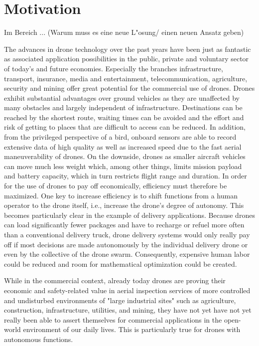\chapter{Motivation}

{\color{cyan}Im Bereich ... (Warum muss es eine neue L"osung/ einen neuen Ansatz geben)}




The advances in drone technology 
over the past years have been just as fantastic as 
associated application possibilities in the 
public, private and voluntary sector of today's and future economies.
Especially the branches 
infrastructure, transport, insurance, media and entertainment, 
telecommunication, agriculture, security and mining 
offer great potential for the commercial use of drones. \cite{PwC2016}
Drones exhibit substantial advantages over ground vehicles
as they are unaffected by many obstacles and largely independent of infrastructure.
Destinations can be reached by the shortest route, waiting times can be avoided
and the effort and risk of getting to places that are difficult to access can be reduced.
In addition, from the privileged perspective of a bird, onboard sensors 
are able to record extensive data 
of high quality as well as increased speed 
due to the fast aerial maneuverability of drones.
On the downside,
drones as smaller aircraft vehicles can move much less weight
which, among other things, limits mission payload and battery capacity,
which in turn restricts flight range and duration.
In order for the use of drones to pay off economically, efficiency must therefore be maximized.
One key to increase efficiency is to shift functions from a human operator to the drone itself,
i.e., increase the drone's degree of autonomy.
This becomes particularly clear in the example of delivery applications.
Because drones can load significantly fewer packages and
have to recharge or refuel more often than a conventional delivery truck,
drone delivery systems would only really pay off if
most decisions are made autonomously by the individual delivery drone
or even by the collective of the drone swarm.
Consequently, expensive human labor could be reduced
and room for mathematical optimization could be created.

While in the commercial context,
already today drones are proving their economic and safety-related value
in aerial inspection services of
more controlled and undisturbed 
environments of "large industrial sites" such as
agriculture,
construction,
infrastructure,
utilities,
and mining,
they have not yet have not yet really 
been able to assert themselves for 
commercial applications in the open-world environment
of our daily lives.
This is particularly true for drones with
autonomous functions.


